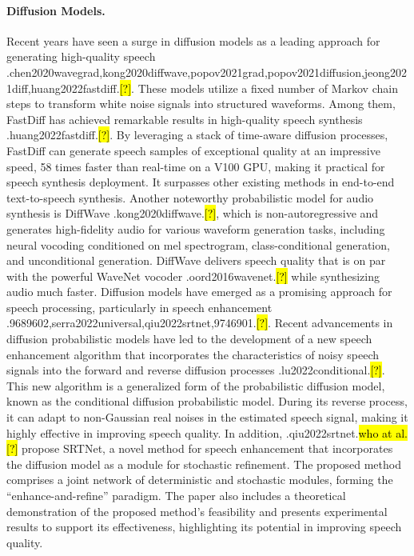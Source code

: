 \documentclass{article}
\let\realcite\cite
\renewcommand{\cite}[1]{\ifx.#1.\hl{[?]}\else\realcite{#1}\fi}
\let\realcitet\citet
\renewcommand{\citet}[1]{\ifx.#1.\hl{who at al. [?]}\else\realcitet{#1}\fi}
\begin{document}
\paragraph{Diffusion Models.}
Recent years have seen a surge in diffusion models as a leading approach for generating high-quality speech \cite{chen2020wavegrad,kong2020diffwave,popov2021grad,popov2021diffusion,jeong2021diff,huang2022fastdiff}. These models utilize a fixed number of Markov chain steps to transform white noise signals into structured waveforms. Among them, FastDiff has achieved remarkable results in high-quality speech synthesis \cite{huang2022fastdiff}. By leveraging a stack of time-aware diffusion processes, FastDiff can generate speech samples of exceptional quality at an impressive speed, 58 times faster than real-time on a V100 GPU, making it practical for speech synthesis deployment. It surpasses other existing methods in end-to-end text-to-speech synthesis. Another noteworthy probabilistic model for audio synthesis is DiffWave \cite{kong2020diffwave}, which is non-autoregressive and generates high-fidelity audio for various waveform generation tasks, including neural vocoding conditioned on mel spectrogram, class-conditional generation, and unconditional generation. DiffWave delivers speech quality that is on par with the powerful WaveNet vocoder \cite{oord2016wavenet} while synthesizing audio much faster.
Diffusion models have emerged as a promising approach for speech processing, particularly in speech enhancement \cite{9689602,serra2022universal,qiu2022srtnet,9746901}. Recent advancements in diffusion probabilistic models have led to the development of a new speech enhancement algorithm that incorporates the characteristics of noisy speech signals into the forward and reverse diffusion processes \cite{lu2022conditional}. This new algorithm is a generalized form of the probabilistic diffusion model, known as the conditional diffusion probabilistic model. During its reverse process, it can adapt to non-Gaussian real noises in the estimated speech signal, making it highly effective in improving speech quality.
In addition, \citet{qiu2022srtnet} propose SRTNet, a novel method for speech enhancement that incorporates the diffusion model as a module for stochastic refinement. The proposed method comprises a joint network of deterministic and stochastic modules, forming the “enhance-and-refine” paradigm. The paper also includes a theoretical demonstration of the proposed method’s feasibility and presents experimental results to support its effectiveness, highlighting its potential in improving speech quality. 
\end{document}
